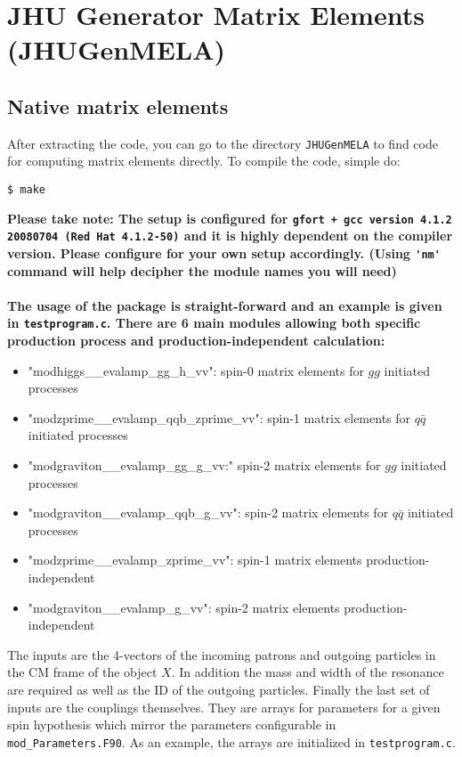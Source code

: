 \documentclass[aps,superscriptaddress,nofootinbib]{revtex4}
\begin{document}
\section{ JHU Generator Matrix Elements (JHUGenMELA)}

\subsection{Native matrix elements}

After extracting the code, you can go to the directory \verb|JHUGenMELA| to find code for computing matrix elements directly.
To compile the code, simple do:
\begin{verbatim}
$ make
\end{verbatim}

\noindent
\bf Please take note: The setup is configured for \verb|gfort + gcc version 4.1.2 20080704 (Red Hat 4.1.2-50)| and it is highly dependent on the compiler version.  Please configure for your own setup accordingly.  {\rm (Using \verb|'nm'| command will help decipher the module names you will need)}\\
\\
\rm
\noindent
The usage of the package is straight-forward and an example is given in \verb|testprogram.c|.
There are 6 main modules allowing both specific production process and production-independent calculation:
\begin{itemize}
\item "modhiggs\_\_evalamp\_gg\_h\_vv": spin-0 matrix elements for $gg$ initiated processes
\item "modzprime\_\_evalamp\_qqb\_zprime\_vv": spin-1 matrix elements for $q\bar{q}$ initiated processes
\item "modgraviton\_\_evalamp\_gg\_g\_vv:" spin-2 matrix elements for $gg$ initiated processes
\item "modgraviton\_\_evalamp\_qqb\_g\_vv": spin-2 matrix elements for $q\bar{q}$ initiated processes
\item "modzprime\_\_evalamp\_zprime\_vv": spin-1 matrix elements production-independent
\item "modgraviton\_\_evalamp\_g\_vv": spin-2 matrix elements production-independent

\end{itemize}

The inputs are the 4-vectors of the incoming patrons and outgoing particles in the CM frame of the object $X$.
In addition the mass and width of the resonance are required as well as the ID of the outgoing particles.
Finally the last set of inputs are the couplings themselves.  They are arrays for parameters for a given spin hypothesis
which mirror the parameters configurable in \verb|mod_Parameters.F90|.
As an example, the arrays are initialized in \verb|testprogram.c|.
\end{document}
